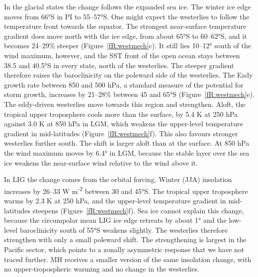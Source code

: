 \documentclass[11pt,a4paper]{article}
\begin{document}
In the glacial states the change follows the expanded sea ice. The winter ice edge moves from 66°S in PI to 55--57°S. One might expect the westerlies to follow the temperature front towards the equator. The strongest near-surface temperature gradient does move north with the ice edge, from about 65°S to 60--62°S, and it becomes 24--29\% steeper (Figure~\ref{fR:westmech}c). It still lies 10--12° south of the wind maximum, however, and the SST front of the open ocean stays between 38.5 and 40.5°S in every state, north of the westerlies. The steeper gradient therefore raises the baroclinicity on the poleward side of the westerlies. The Eady growth rate between 850 and 500 hPa, a standard measure of the potential for storm growth, increases by 21--28\% between 45 and 65°S (Figure~\ref{fR:westmech}e). The eddy-driven westerlies move towards this region and strengthen. Aloft, the tropical upper troposphere cools more than the surface, by 5.4 K at 250 hPa against 3.0 K at 850 hPa in LGM, which weakens the upper-level temperature gradient in mid-latitudes (Figure~\ref{fR:westmech}f). This also favours stronger westerlies further south. The shift is larger aloft than at the surface. At 850 hPa the wind maximum moves by 6.4° in LGM, because the stable layer over the sea ice weakens the near-surface wind relative to the wind above it.

In LIG the change comes from the orbital forcing. Winter (JJA) insolation increases by 26--33 W m\textsuperscript{-2} between 30 and 45°S. The tropical upper troposphere warms by 2.3 K at 250 hPa, and the upper-level temperature gradient in mid-latitudes steepens (Figure~\ref{fR:westmech}f). Sea ice cannot explain this change, because the circumpolar mean LIG ice edge retreats by about 1° and the low-level baroclinicity south of 55°S weakens slightly. The westerlies therefore strengthen with only a small poleward shift. The strengthening is largest in the Pacific sector, which points to a zonally asymmetric response that we have not traced further. MH receives a smaller version of the same insolation change, with no upper-tropospheric warming and no change in the westerlies.
\end{document}
